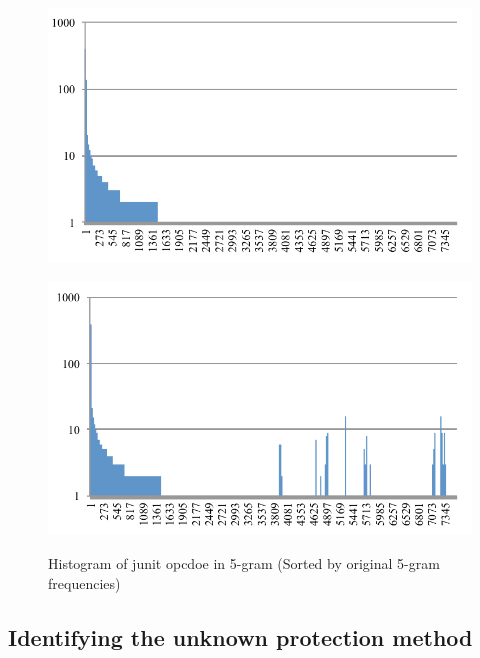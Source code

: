 \documentclass[conference]{IEEEtran}
\begin{document}
\begin{figure}[bt]
  \centering
  \begin{minipage}[b]{0.48\linewidth}
    \includegraphics[clip,width=1.0\columnwidth]{images/ORI_junit}%
    \label{fig:junit-5gram-original-histogram}%
  \end{minipage}
  \begin{minipage}[b]{0.48\linewidth}
    \includegraphics[clip,width=1.0\columnwidth]{images/MLI_junit}%
    \label{fig:junit-5gram-ALL-histogram}%
  \end{minipage}\vspace{0.5cm}
  \caption{Histogram of junit opcdoe in 5-gram (Sorted by original 5-gram frequencies)}
  \label{fig:junit-5gram-histogram}
\end{figure}
  

\subsection{Identifying the unknown protection method}
\end{document}
